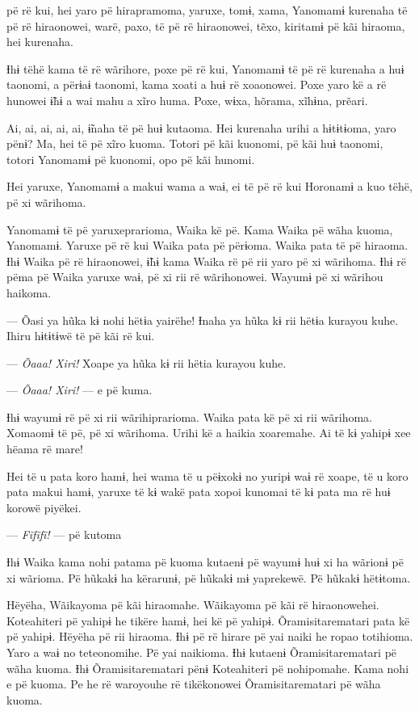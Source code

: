  pë rë kui, hei yaro pë hirapramoma, yaruxe, tomɨ, xama, Yanomamɨ
kurenaha të pë rë hiraonowei, warë, paxo, të pë rë hiraonowei, tẽxo,
kiritamɨ pë kãi hiraoma, hei kurenaha. 

Ɨhɨ tëhë kama të rë wãrihore, poxe pë rë kui, Yanomamɨ të pë rë kurenaha
a huɨ taonomi, a përɨaɨ taonomi, kama xoati a huɨ rë xoaonowei. Poxe
yaro kë a rë hunowei ɨ̃hɨ a wai mahu a xĩro huma. Poxe, wɨxa, hõrama,
xĩhɨna, prẽari. 

Ai, ai, ai, ai, ai, ɨ̃naha të pë huɨ kutaoma. Hei kurenaha urihi a
 hɨtɨtɨoma, yaro pënɨ? Ma, hei të pë xĩro kuoma. Totori pë kãi kuonomi,
 pë kãi huɨ taonomi, totori Yanomamɨ pë kuonomi, opo pë kãi hunomi. 

Hei yaruxe, Yanomamɨ a makui wama a waɨ, ei të pë rë kui Horonamɨ a kuo
tëhë, pë xi wãrihoma. 

Yanomamɨ të pë yaruxeprarioma, Waika kë pë. Kama Waika pë wãha kuoma,
 Yanomamɨ. Yaruxe pë rë kui Waika pata pë përɨoma. Waika pata të pë
 hiraoma. Ɨhɨ Waika pë rë hiraonowei, ɨ̃hɨ kama Waika rë pë rii yaro pë xi
 wãrihoma. Ɨhɨ rë pëma pë Waika yaruxe waɨ, pë xi rii rë wãrihonowei.
 Wayumɨ pë xi wãrihou haikoma.

--- Õasi ya hũka kɨ nohi hëtɨa yairëhe! Ɨnaha ya hũka kɨ rii hëtɨa
kurayou kuhe. Ihiru hɨtɨtɨwë të pë kãi rë kui. 

--- \textit{Õaaa! Xiri!} Xoape ya hũka kɨ rii hëtia kurayou kuhe. 

--- \textit{Õaaa! Xiri!} --- e pë kuma. 

Ɨhɨ wayumɨ rë pë xi rii wãrihiprarioma. Waika pata kë pë xi rii
wãrihoma. Xomaomɨ të pë, pë xi wãrihoma. Urihi kë a haikia xoaremahe. Ai
të kɨ yahipɨ xee hëama rë mare! 

Hei të u pata koro hamɨ, hei wama të u pëɨxokɨ no yuripɨ waɨ rë xoape,
të u koro pata makui hamɨ, yaruxe të kɨ wakë pata xopoi kunomai të kɨ
pata ma rë huɨ korowë piyëkei. 

--- \textit{Fĩfĩfĩ!} --- pë kutoma

Ɨhɨ Waika kama nohi patama pë kuoma kutaenɨ pë wayumɨ huɨ xi ha wãrionɨ
pë xi wãrioma. Pë hũkakɨ ha kërarunɨ, pë hũkakɨ mɨ yaprekewë. Pë hũkakɨ
hëtɨtoma.

Hëyëha, Wãikayoma pë kãi hiraomahe. Wãikayoma pë kãi rë hiraonowehei.
Koteahiteri pë yahipɨ he tikëre hamɨ, hei kë pë yahipɨ.
Õramisitarematari pata kë pë yahipɨ. Hëyëha pë rii hiraoma. Ɨhɨ pë rë
hirare pë yai naiki he ropao totihioma. Yaro a waɨ no teteonomihe. Pë
yai naikioma. Ɨhɨ kutaenɨ Õramisitarematari pë wãha kuoma. Ɨhɨ
Õramisitarematari pënɨ Koteahiteri pë nohipomahe. Kama nohi e pë kuoma.
Pe he rë waroyouhe rë tikëkonowei Õramisitarematari pë wãha kuoma. 


